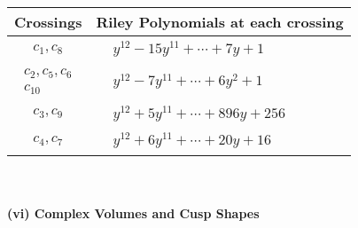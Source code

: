 \documentclass[1p]{elsarticle_modified}
\theoremstyle{definition}
\begin{document}
\begin{tabular}{m{50pt}|m{274pt}}
Crossings & \hspace{64pt}Riley Polynomials at each crossing \\
\hline $$\begin{aligned}c_{1},c_{8}\end{aligned}$$&$\begin{aligned}
&y^{12}-15 y^{11}+\cdots+7 y+1
\end{aligned}$\\
\hline $$\begin{aligned}c_{2},c_{5},c_{6}\\c_{10}\end{aligned}$$&$\begin{aligned}
&y^{12}-7 y^{11}+\cdots+6 y^2+1
\end{aligned}$\\
\hline $$\begin{aligned}c_{3},c_{9}\end{aligned}$$&$\begin{aligned}
&y^{12}+5 y^{11}+\cdots+896 y+256
\end{aligned}$\\
\hline $$\begin{aligned}c_{4},c_{7}\end{aligned}$$&$\begin{aligned}
&y^{12}+6 y^{11}+\cdots+20 y+16
\end{aligned}$\\
\hline
\end{tabular}\\~\\
\newpage\flushleft \textbf{(vi) Complex Volumes and Cusp Shapes}
\end{document}
